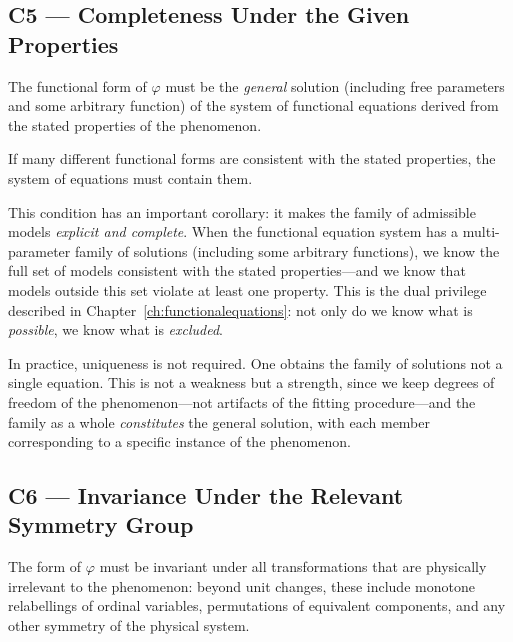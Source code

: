 \subsection{C5 --- Completeness Under the Given Properties}

\begin{condbox}
\begin{condition}
  \label{cond:ucq:unique}
The functional form of $\varphi$ must be the \emph{general}
solution (including free parameters and some arbitrary function) of the system of functional equations derived from the stated properties of the phenomenon.
\end{condition}
\end{condbox}

If many different functional forms are consistent with the stated
properties, the system of equations must contain them.

This condition has an important corollary: it makes the family of
admissible models \emph{explicit and complete}.  When the
functional equation system has a multi-parameter family of
solutions (including some arbitrary functions), we know the full set of models consistent with the
stated properties---and we know that models outside this set
violate at least one property.  This is the dual privilege
described in Chapter~\ref{ch:functionalequations}: not only do we
know what is \emph{possible}, we know what is \emph{excluded}.

In practice, uniqueness is not required. One obtains the family of solutions not a single equation.  This is not a weakness but a strength, since we keep degrees of freedom of the phenomenon---not artifacts of the fitting procedure---and the
family as a whole \emph{constitutes} the general solution, with each member corresponding to a specific instance of the phenomenon.

\subsection{C6 --- Invariance Under the Relevant Symmetry Group}

\begin{condbox}
\begin{condition}
  \label{cond:ucq:symm}
The form of $\varphi$ must be invariant under all transformations
that are physically irrelevant to the phenomenon: beyond unit
changes, these include monotone relabellings of ordinal variables,
permutations of equivalent components, and any other symmetry of
the physical system.
\end{condition}
\end{condbox}

